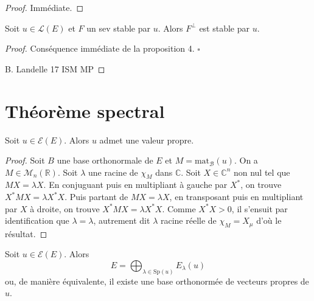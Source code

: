 \begin{proof}

Immédiate.

\end{proof}

\begin{proposition}
\label{prop:29}

Soit $u \in \mathcal{L}(E)$ et $F$ un sev stable par $u$. Alors $F^{\perp}$ est stable par $u$.
\end{proposition}

\begin{proof}

Conséquence immédiate de la proposition 4. $\square$

\vspace{1cm}
B. Landelle \hspace{2cm} 17 \hspace{2cm} ISM MP

\end{proof}

\section{Théorème spectral}

\begin{theorem}
\label{thm:10}

Soit $u \in \mathcal{E}(E)$. Alors $u$ admet une valeur propre.

\end{theorem}

\begin{proof}

Soit $B$ une base orthonormale de $E$ et $M = \text{mat}_{\mathcal{B}}(u)$. On a $M \in \mathcal{M}_n(\mathbb{R})$. Soit $\lambda$ une racine de $\chi_M$ dans $\mathbb{C}$. Soit $X \in \mathbb{C}^n$ non nul tel que $MX = \lambda X$. En conjuguant puis en multipliant à gauche par $X^*$, on trouve $X^*MX = \lambda X^*X$. Puis partant de $MX = \lambda X$, en transposant puis en multipliant par $X$ à droite, on trouve $X^*MX = \lambda X^*X$. Comme $X^*X > 0$, il s'ensuit par identification que $\lambda = \lambda$, autrement dit $\lambda$ racine réelle de $\chi_M = X_\mu$ d'où le résultat.

\end{proof}

\begin{theorem}
\label{thm:theoreme-spectral}

Soit $u \in \mathcal{E}(E)$. Alors
\[
E = \bigoplus_{\lambda \in \text{Sp}(u)} E_\lambda(u)
\]
ou, de manière équivalente, il existe une base orthonormée de vecteurs propres de $u$.

\end{theorem}

